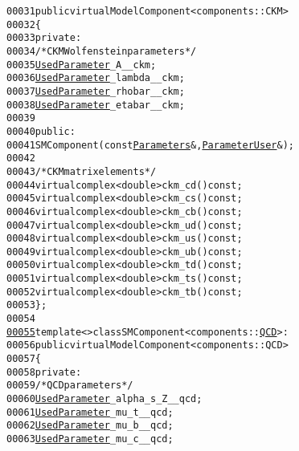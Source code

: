 \begin{footnotesize}
\begin{alltt}
00031         \textcolor{keyword}{public} \textcolor{keyword}{virtual} ModelComponent<components::CKM>
00032     \{
00033         \textcolor{keyword}{private}:
00034             \textcolor{comment}{/* CKM Wolfenstein parameters */}
00035             \hyperlink{classeos_1_1UsedParameter}{UsedParameter} \_A\_\_ckm;
00036             \hyperlink{classeos_1_1UsedParameter}{UsedParameter} \_lambda\_\_ckm;
00037             \hyperlink{classeos_1_1UsedParameter}{UsedParameter} \_rhobar\_\_ckm;
00038             \hyperlink{classeos_1_1UsedParameter}{UsedParameter} \_etabar\_\_ckm;
00039 
00040         \textcolor{keyword}{public}:
00041             SMComponent(\textcolor{keyword}{const} \hyperlink{classeos_1_1Parameters}{Parameters} &, \hyperlink{classeos_1_1ParameterUser}{ParameterUser} &);
00042 
00043             \textcolor{comment}{/* CKM matrix elements */}
00044             \textcolor{keyword}{virtual} complex<double> ckm\_cd() \textcolor{keyword}{const};
00045             \textcolor{keyword}{virtual} complex<double> ckm\_cs() \textcolor{keyword}{const};
00046             \textcolor{keyword}{virtual} complex<double> ckm\_cb() \textcolor{keyword}{const};
00047             \textcolor{keyword}{virtual} complex<double> ckm\_ud() \textcolor{keyword}{const};
00048             \textcolor{keyword}{virtual} complex<double> ckm\_us() \textcolor{keyword}{const};
00049             \textcolor{keyword}{virtual} complex<double> ckm\_ub() \textcolor{keyword}{const};
00050             \textcolor{keyword}{virtual} complex<double> ckm\_td() \textcolor{keyword}{const};
00051             \textcolor{keyword}{virtual} complex<double> ckm\_ts() \textcolor{keyword}{const};
00052             \textcolor{keyword}{virtual} complex<double> ckm\_tb() \textcolor{keyword}{const};
00053     \};
00054 
\hypertarget{standard-model_8hh_source_l00055}{}\hyperlink{classeos_1_1SMComponent_3_01components_1_1QCD_01_4}{00055}     \textcolor{keyword}{template} <> \textcolor{keyword}{class }SMComponent<components::\hyperlink{classeos_1_1QCD}{QCD}> :
00056         \textcolor{keyword}{public} \textcolor{keyword}{virtual} ModelComponent<components::QCD>
00057     \{
00058         \textcolor{keyword}{private}:
00059             \textcolor{comment}{/* QCD parameters */}
00060             \hyperlink{classeos_1_1UsedParameter}{UsedParameter} \_alpha\_s\_Z\_\_qcd;
00061             \hyperlink{classeos_1_1UsedParameter}{UsedParameter} \_mu\_t\_\_qcd;
00062             \hyperlink{classeos_1_1UsedParameter}{UsedParameter} \_mu\_b\_\_qcd;
00063             \hyperlink{classeos_1_1UsedParameter}{UsedParameter} \_mu\_c\_\_qcd;

\end{alltt}
\end{footnotesize}
